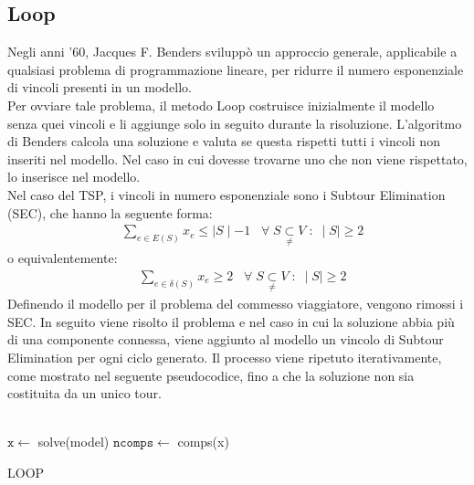 \subsection{Loop}
Negli anni '60, Jacques F. Benders sviluppò un approccio generale, applicabile a qualsiasi problema di programmazione lineare, per ridurre il numero esponenziale di vincoli presenti in un modello.\\
Per ovviare tale problema, il metodo Loop costruisce inizialmente il modello senza quei vincoli e li aggiunge solo in seguito durante la risoluzione. L'algoritmo di Benders calcola una soluzione e valuta se questa rispetti tutti i vincoli non inseriti nel modello. Nel caso in cui dovesse trovarne uno che non viene rispettato, lo inserisce nel modello.\\ 
Nel caso del TSP, i vincoli in numero esponenziale sono i Subtour Elimination (SEC), che hanno la seguente forma:
\begin{align}
&\underset{e\in E(S)}\sum{x_{e}} \leq \mid S\mid - 1\;\;\;\forall\;S\underset{\neq}{\subset}V\; : \; \mid S\mid\geq 2
\end{align}
o equivalentemente:
\begin{align}
&\underset{e\in \delta(S)}\sum{x_{e}}\geq 2\;\;\;\forall\;S\underset{\neq}{\subset}V\; : \; \mid S\mid\geq 2
\end{align}
Definendo il modello per il problema del commesso viaggiatore, vengono rimossi i SEC. In seguito viene risolto il problema e nel caso in cui la soluzione abbia più di una componente connessa, viene aggiunto al modello un vincolo di Subtour Elimination per ogni ciclo generato. Il processo viene ripetuto iterativamente, come mostrato nel seguente pseudocodice, fino a che la soluzione non sia costituita da un unico tour.\\\\
\begin{algorithm}[H]
\DontPrintSemicolon
{}
\BlankLine 
 $\mathtt{x} \gets$ solve(model)\;
 $\mathtt{ncomps} \gets$ comps(x)\;
 \BlankLine 
 \caption{LOOP}
\end{algorithm}
